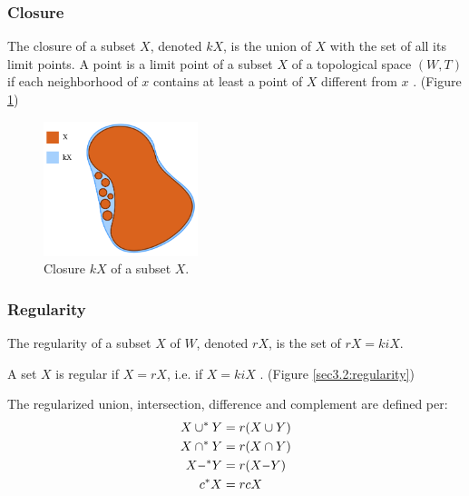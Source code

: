 \documentclass[a4paper,11pt,oneside]{article}
\newcommand{\minus}{\scalebox{0.9}[1.0]{$-$}} %
\begin{document}
\subsubsection{Closure}
    
\begin{definition}
	The closure of a subset $X$, denoted $kX$, is the union of $X$ with the set of all its limit points. A point is a limit point of a subset $X$ of a topological space $(W, T)$ if each neighborhood of $x$ contains at least a point of $X$ different from $x$ \cite{Requicha1978MathematicalFO}. (Figure \ref{sec3.2:closure})
\end{definition}
    
\begin{figure}[ht]
	\begin{center}
		\includegraphics[width=0.4\textwidth]{section3/3.2/closure.png}
	\end{center}
	\caption{Closure $kX$ of a subset $X$.}
	\label{sec3.2:closure}
\end{figure}
    
\subsubsection{Regularity}
    
\begin{definition}[Regularity]
	The regularity of a subset $X$ of $W$, denoted $rX$, is the set of $rX = kiX$. \cite{mansfield_1987}
\end{definition}
\begin{definition}
	A set $X$ is regular if $X = rX$, i.e. if $X = kiX$ \cite{mansfield_1987}. (Figure \ref{sec3.2:regularity}) 
\end{definition}
    
\begin{definition}
	The regularized union, intersection, difference and complement are defined per:
	\begin{align*} 
		X \cup^* Y   & = r(X \cup Y)    \\
		X \cap^* Y   & = r(X \cap Y)    \\
		X \minus^*Y & = r(X \minus Y) \\
		c{^*}X       & = rcX            
	\end{align*}
\end{definition}
    
\end{document}
